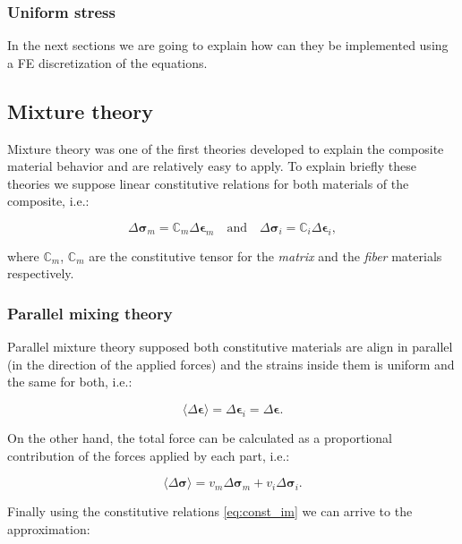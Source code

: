 \documentclass[preprint]{elsarticle}
\begin{document}
\subsubsection{Uniform stress}

In the next sections we are going to explain how can they be implemented using a FE discretization of the equations.

\subsection{Mixture theory}

Mixture theory was one of the first theories developed to explain the composite
material behavior and are relatively easy to apply. 
To explain briefly these theories we suppose linear constitutive relations for 
both materials of the composite, i.e.:

\begin{equation}
\Delta \bm{\sigma}_m = \mathbb{C}_m  \Delta \bm{\epsilon}_m 
\quad\text{and}\quad 
\Delta \bm{\sigma}_i = \mathbb{C}_i  \Delta \bm{\epsilon}_i,
\label{eq:const_im}
\end{equation}

\noindent
where $\mathbb{C}_m$, $\mathbb{C}_m$ are the constitutive tensor for the
\emph{matrix} and the \emph{fiber} materials respectively.

\subsubsection{Parallel mixing theory}

Parallel mixture theory supposed both constitutive materials are align in parallel (in the
direction of the applied forces) and the
strains inside them is uniform and the same for both, i.e.:

\begin{equation}
\langle\Delta \bm{\epsilon}\rangle = \Delta \bm{\epsilon}_i = \Delta \bm{\epsilon}.
\end{equation}

\noindent
On the other hand, the total force can be calculated as a proportional
contribution of the forces applied by each part, i.e.:

\begin{equation}
\langle\Delta \bm{\sigma}\rangle  = v_m \Delta \bm{\sigma}_m + v_i \Delta \bm{\sigma}_i.
\end{equation}

Finally using the constitutive relations \ref{eq:const_im} we can arrive to the
approximation:
\end{document}
